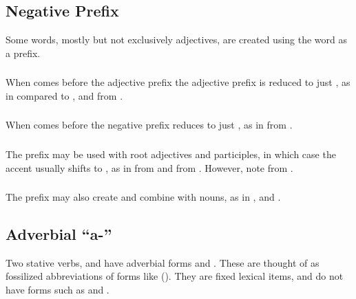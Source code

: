 \subsection{Negative Prefix} Some words, mostly but not exclusively
adjectives, are created using the word   as a prefix.

\subsubsection{} When  comes before the adjective prefix
 the adjective prefix is reduced to just , as in
  compared to 
, and   from
 .

\subsubsection{} When  comes before  the negative prefix
reduces to just , as in   from
 .

\subsubsection{} The  prefix may be used with root adjectives
and participles, in which case the accent usually shifts to ,
as in   from   and
  from  .  However,
note   from  .
\label{lingop:prefix:ke}

\subsubsection{} The  prefix may also create and combine with
nouns, as in  , and 
.  


\subsection{Adverbial ``a-''} Two stative verbs,  
and   have adverbial forms   and  .  These are
thought of as fossilized abbreviations of forms like  ().  They are fixed lexical items, and do
not have forms such as  and .


